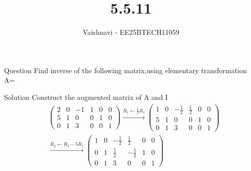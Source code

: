 \documentclass{beamer}
\title %
{5.5.11}
\author %
{Vaishnavi - EE25BTECH11059}
\begin{document}
\frame{\titlepage}
\begin{frame}{Question}
Find inverse of the following matrix,using elementary transformation\\
A=
\end{frame}

\begin{frame}{Solution}
Construct the augmented matrix of A and I
\begin{align}
&\left(
\begin{array}{ccc|ccc}
2 & 0 & -1 & 1 & 0 & 0 \\
5 & 1 & 0 & 0 & 1 & 0 \\
0 & 1 & 3 & 0 & 0 & 1
\end{array}
\right)
\xrightarrow{R_1 \gets \frac{1}{2}R_1}
\left(
\begin{array}{ccc|ccc}
1 & 0 & -\frac{1}{2} & \frac{1}{2} & 0 & 0 \\
5 & 1 & 0 & 0 & 1 & 0 \\
0 & 1 & 3 & 0 & 0 & 1
\end{array}
\right) \\[12pt]
&\xrightarrow{R_2 \gets R_2 - 5R_1}
\left(
\begin{array}{ccc|ccc}
1 & 0 & -\frac{1}{2} & \frac{1}{2} & 0 & 0 \\
0 & 1 & \frac{5}{2} & -\frac{5}{2} & 1 & 0 \\
0 & 1 & 3 & 0 & 0 & 1
\end{array}
\right)
\end{align}
\end{frame}
\end{document}
